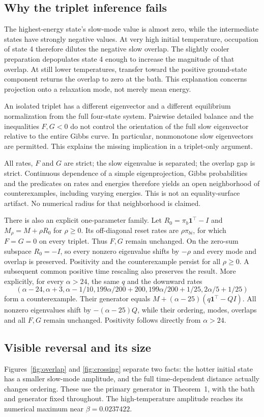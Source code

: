 \documentclass[11pt]{article}
\begin{document}
\subsection{Why the triplet inference fails}
The highest-energy state's slow-mode value is almost zero, while the intermediate states have strongly negative values. At very high initial temperature, occupation of state 4 therefore dilutes the negative slow overlap. The slightly cooler preparation depopulates state 4 enough to increase the magnitude of that overlap. At still lower temperatures, transfer toward the positive ground-state component returns the overlap to zero at the bath. This explanation concerns projection onto a relaxation mode, not merely mean energy.

An isolated triplet has a different eigenvector and a different equilibrium normalization from the full four-state system. Pairwise detailed balance and the inequalities $F,G<0$ do not control the orientation of the full slow eigenvector relative to the entire Gibbs curve. In particular, nonmonotone slow eigenvectors are permitted. This explains the missing implication in a triplet-only argument.

All rates, $F$ and $G$ are strict; the slow eigenvalue is separated; the overlap gap is strict. Continuous dependence of a simple eigenprojection, Gibbs probabilities and the predicates on rates and energies therefore yields an open neighborhood of counterexamples, including varying energies. This is not an equality-surface artifact. No numerical radius for that neighborhood is claimed.

There is also an explicit one-parameter family. Let $R_0=\pi_b\mathbf1^\top-I$ and $M_\rho=M+\rho R_0$ for $\rho\geq0$. Its off-diagonal reset rates are $\rho\pi_{bi}$, for which $F=G=0$ on every triplet. Thus $F,G$ remain unchanged. On the zero-sum subspace $R_0=-I$, so every nonzero eigenvalue shifts by $-\rho$ and every mode and overlap is preserved. Positivity and the counterexample persist for all $\rho\geq0$. A subsequent common positive time rescaling also preserves the result. More explicitly, for every $\alpha>24$, the same $q$ and the downward rates
\[
(\alpha-24,\alpha+3,\alpha-1/10,
199\alpha/200+200,199\alpha/200+1/25,2\alpha/5+1/25)
\]
form a counterexample. Their generator equals $M+(\alpha-25)(q\mathbf1^\top-QI)$. All nonzero eigenvalues shift by $-(\alpha-25)Q$, while their ordering, modes, overlaps and all $F,G$ remain unchanged. Positivity follows directly from $\alpha>24$.

\subsection{Visible reversal and its size}
Figures~\ref{fig:overlap} and \ref{fig:crossing} separate two facts: the hotter initial state has a smaller slow-mode amplitude, and the full time-dependent distance actually changes ordering. These use the primary generator in Theorem~1, with the bath and generator fixed throughout. The high-temperature amplitude reaches its numerical maximum near $\beta=0.0237422$.
\end{document}

